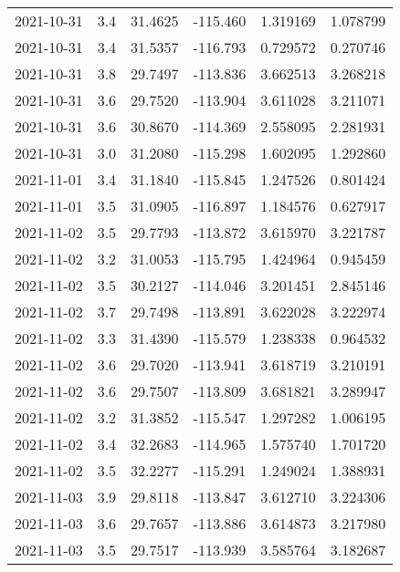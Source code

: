\begin{tabular}{lrrrrr}
2021-10-31 &       3.4 &  31.4625 &  -115.460 &         1.319169 &         1.078799 \\
2021-10-31 &       3.4 &  31.5357 &  -116.793 &         0.729572 &         0.270746 \\
2021-10-31 &       3.8 &  29.7497 &  -113.836 &         3.662513 &         3.268218 \\
2021-10-31 &       3.6 &  29.7520 &  -113.904 &         3.611028 &         3.211071 \\
2021-10-31 &       3.6 &  30.8670 &  -114.369 &         2.558095 &         2.281931 \\
2021-10-31 &       3.0 &  31.2080 &  -115.298 &         1.602095 &         1.292860 \\
2021-11-01 &       3.4 &  31.1840 &  -115.845 &         1.247526 &         0.801424 \\
2021-11-01 &       3.5 &  31.0905 &  -116.897 &         1.184576 &         0.627917 \\
2021-11-02 &       3.5 &  29.7793 &  -113.872 &         3.615970 &         3.221787 \\
2021-11-02 &       3.2 &  31.0053 &  -115.795 &         1.424964 &         0.945459 \\
2021-11-02 &       3.5 &  30.2127 &  -114.046 &         3.201451 &         2.845146 \\
2021-11-02 &       3.7 &  29.7498 &  -113.891 &         3.622028 &         3.222974 \\
2021-11-02 &       3.3 &  31.4390 &  -115.579 &         1.238338 &         0.964532 \\
2021-11-02 &       3.6 &  29.7020 &  -113.941 &         3.618719 &         3.210191 \\
2021-11-02 &       3.6 &  29.7507 &  -113.809 &         3.681821 &         3.289947 \\
2021-11-02 &       3.2 &  31.3852 &  -115.547 &         1.297282 &         1.006195 \\
2021-11-02 &       3.4 &  32.2683 &  -114.965 &         1.575740 &         1.701720 \\
2021-11-02 &       3.5 &  32.2277 &  -115.291 &         1.249024 &         1.388931 \\
2021-11-03 &       3.9 &  29.8118 &  -113.847 &         3.612710 &         3.224306 \\
2021-11-03 &       3.6 &  29.7657 &  -113.886 &         3.614873 &         3.217980 \\
2021-11-03 &       3.5 &  29.7517 &  -113.939 &         3.585764 &         3.182687 \\

\end{tabular}
